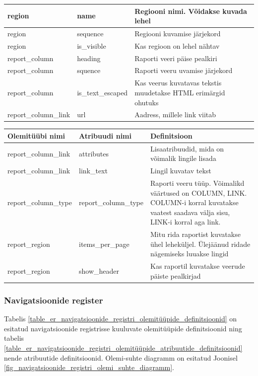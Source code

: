 \documentclass[a4paper,12pt]{article} %
\begin{document}
\begin{table}[H]
\begin{tabular}{|p{4cm}|p{4cm}|p{7cm}|}
region & name & Regiooni nimi. Võidakse kuvada lehel \\ \hline
region & sequence & Regiooni kuvamise järjekord \\ \hline
region & is\_visible & Kas regioon on lehel nähtav \\ \hline
report\_column & heading & Raporti veeri päise pealkiri \\ \hline
report\_column & squence & Raporti veeru uvamise järjekord \\ \hline
report\_column & is\_text\_escaped & Kas veerus kuvatavas tekstis muudetakse HTML erimärgid ohutuks \\ \hline
report\_column\_link & url & Aadress, millele link viitab \\ \hline
\end{tabular}
\end{table}

\begin{table}[H]
\centering
\begin{tabular}{|p{4cm}|p{4cm}|p{7cm}|}
\hline
\rowcolor{rowgray}
Olemitüübi nimi & Atribuudi nimi & Definitsioon \\ \hline
report\_column\_link & attributes & Lisaatribuudid, mida on võimalik lingile lisada \\ \hline
report\_column\_link & link\_text & Lingil kuvatav tekst \\ \hline
report\_column\_type & report\_column\_type & Raporti veeru tüüp. Võimalikd väärtused on COLUMN, LINK. COLUMN-i korral kuvatakse vaatest saadava välja sisu, LINK-i korral aga link. \\ \hline
report\_region & items\_per\_page & Mitu rida raportist kuvatakse ühel leheküljel. Ülejäänud ridade nägemiseks luuakse lingid \\ \hline
report\_region & show\_header & Kas raportil kuvatakse veerude päiste pealkirjad \\ \hline
\end{tabular}
\end{table}

\subsubsection{Navigatsioonide register}
Tabelis \ref{table_er_navigatsioonide_registri_olemitüüpide_definitsioonid} on esitatud navigatsioonide registrisse kuuluvate olemitüüpide definitsioonid ning tabelis \ref{table_er_navigatsioonide_registri_olemitüüpide_atribuutide_definitsioonid} nende atribuutide definitsioonid. Olemi-suhte diagramm on esitatud Joonisel \ref{fig_navigatsioonide_registri_olemi_suhte_diagramm}.
\end{document}
